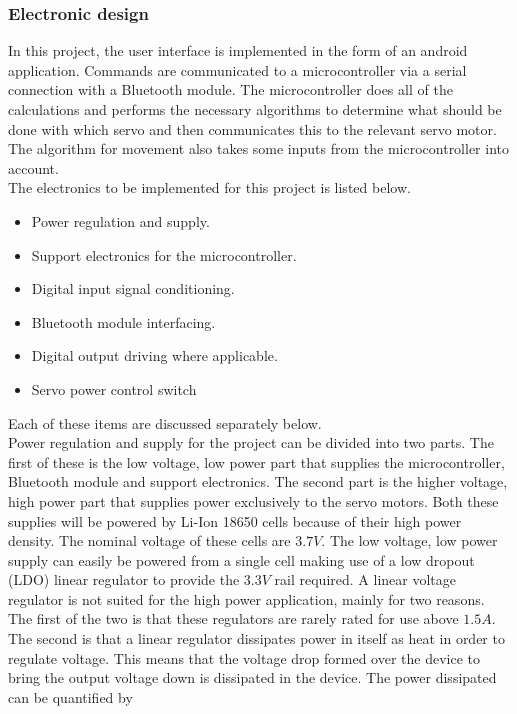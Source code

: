 \subsubsection{Electronic design}
In this project, the user interface is implemented in the form of an android application. Commands are communicated to a microcontroller via a serial connection with a Bluetooth module. The microcontroller does all of the calculations and performs the necessary algorithms to determine what should be done with which servo and then communicates this to the relevant servo motor. The algorithm for movement also takes some inputs from the microcontroller into account.\\

The electronics to be implemented for this project is listed below. 
\begin{itemize}
\item Power regulation and supply.
\item Support electronics for the microcontroller.
\item Digital input signal conditioning.
\item Bluetooth module interfacing.
\item Digital output driving where applicable.
\item Servo power control switch
\end{itemize}
Each of these items are discussed separately below.\\

Power regulation and supply for the project can be divided into two parts. The first of these is the low voltage, low power part that supplies the microcontroller, Bluetooth module and support electronics. The second part is the higher voltage, high power part that supplies power exclusively to the servo motors. Both these supplies will be powered by Li-Ion 18650 cells because of their high power density. The nominal voltage of these cells are $3.7V$. The low voltage, low power supply can easily be powered from a single cell making use of a low dropout (LDO) linear regulator to provide the $3.3V$ rail required. A linear voltage regulator is not suited for the high power application, mainly for two reasons. The first of the two is that these regulators are rarely rated for use above $1.5A$. The second is that a linear regulator dissipates power in itself as heat in order to regulate voltage. This means that the voltage drop formed over the device to bring the output voltage down is dissipated in the device. The power dissipated can be quantified by

